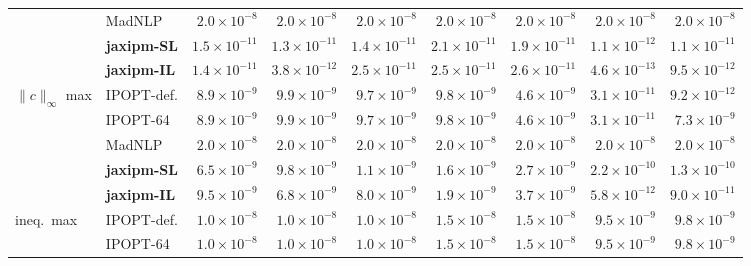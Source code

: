 \begin{table}[p]
{\begin{tabular}{@{}l l r r r r r r r@{}}
 & MadNLP & $2.0\!\times\!10^{-8}$ & $2.0\!\times\!10^{-8}$ & $2.0\!\times\!10^{-8}$ & $2.0\!\times\!10^{-8}$ & $2.0\!\times\!10^{-8}$ & $2.0\!\times\!10^{-8}$ & $2.0\!\times\!10^{-8}$ \\
 & \textbf{jaxipm-SL} & {\boldmath$1.5\!\times\!10^{-11}$} & {\boldmath$1.3\!\times\!10^{-11}$} & {\boldmath$1.4\!\times\!10^{-11}$} & {\boldmath$2.1\!\times\!10^{-11}$} & {\boldmath$1.9\!\times\!10^{-11}$} & {\boldmath$1.1\!\times\!10^{-12}$} & {\boldmath$1.1\!\times\!10^{-11}$} \\
 & \textbf{jaxipm-IL} & {\boldmath$1.4\!\times\!10^{-11}$} & {\boldmath$3.8\!\times\!10^{-12}$} & {\boldmath$2.5\!\times\!10^{-11}$} & {\boldmath$2.5\!\times\!10^{-11}$} & {\boldmath$2.6\!\times\!10^{-11}$} & {\boldmath$4.6\!\times\!10^{-13}$} & {\boldmath$9.5\!\times\!10^{-12}$} \\
\midrule
\multirow{5}{*}{$\|c\|_\infty$ max} & IPOPT-def. & $8.9\!\times\!10^{-9}$ & $9.9\!\times\!10^{-9}$ & $9.7\!\times\!10^{-9}$ & $9.8\!\times\!10^{-9}$ & $4.6\!\times\!10^{-9}$ & $3.1\!\times\!10^{-11}$ & $9.2\!\times\!10^{-12}$ \\
 & IPOPT-64 & $8.9\!\times\!10^{-9}$ & $9.9\!\times\!10^{-9}$ & $9.7\!\times\!10^{-9}$ & $9.8\!\times\!10^{-9}$ & $4.6\!\times\!10^{-9}$ & $3.1\!\times\!10^{-11}$ & $7.3\!\times\!10^{-9}$ \\
 & MadNLP & $2.0\!\times\!10^{-8}$ & $2.0\!\times\!10^{-8}$ & $2.0\!\times\!10^{-8}$ & $2.0\!\times\!10^{-8}$ & $2.0\!\times\!10^{-8}$ & $2.0\!\times\!10^{-8}$ & $2.0\!\times\!10^{-8}$ \\
 & \textbf{jaxipm-SL} & {\boldmath$6.5\!\times\!10^{-9}$} & {\boldmath$9.8\!\times\!10^{-9}$} & {\boldmath$1.1\!\times\!10^{-9}$} & {\boldmath$1.6\!\times\!10^{-9}$} & {\boldmath$2.7\!\times\!10^{-9}$} & {\boldmath$2.2\!\times\!10^{-10}$} & {\boldmath$1.3\!\times\!10^{-10}$} \\
 & \textbf{jaxipm-IL} & {\boldmath$9.5\!\times\!10^{-9}$} & {\boldmath$6.8\!\times\!10^{-9}$} & {\boldmath$8.0\!\times\!10^{-9}$} & {\boldmath$1.9\!\times\!10^{-9}$} & {\boldmath$3.7\!\times\!10^{-9}$} & {\boldmath$5.8\!\times\!10^{-12}$} & {\boldmath$9.0\!\times\!10^{-11}$} \\
\midrule
\multirow{5}{*}{ineq.\ max} & IPOPT-def. & $1.0\!\times\!10^{-8}$ & $1.0\!\times\!10^{-8}$ & $1.0\!\times\!10^{-8}$ & $1.5\!\times\!10^{-8}$ & $1.5\!\times\!10^{-8}$ & $9.5\!\times\!10^{-9}$ & $9.8\!\times\!10^{-9}$ \\
 & IPOPT-64 & $1.0\!\times\!10^{-8}$ & $1.0\!\times\!10^{-8}$ & $1.0\!\times\!10^{-8}$ & $1.5\!\times\!10^{-8}$ & $1.5\!\times\!10^{-8}$ & $9.5\!\times\!10^{-9}$ & $9.8\!\times\!10^{-9}$ \\

\end{tabular}}
\end{table}
